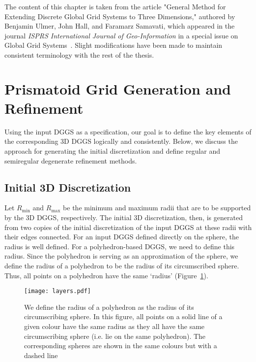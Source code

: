 The content of this chapter is taken from the article "General Method for Extending Discrete Global Grid Systems to Three Dimensions," authored by Benjamin Ulmer, John Hall, and Faramarz Samavati, which appeared in the journal \textit{ISPRS International Journal of Geo-Information} in a special issue on Global Grid Systems~\cite{ulmer2020general}.
Slight modifications have been made to maintain consistent terminology with the rest of the thesis.


\section{Prismatoid Grid Generation and Refinement} \label{chap:5:grid}
Using the input DGGS as a specification, our goal is to define the key elements of the corresponding 3D DGGS logically and consistently.
Below, we discuss the approach for generating the initial discretization and define regular and semiregular degenerate refinement methods. 


\subsection{Initial 3D Discretization} \label{chap:5:discretization}
Let $R_\mathrm{min}$ and $R_\mathrm{max}$ be the minimum and maximum radii that are to be supported by the 3D DGGS, respectively.
The initial 3D discretization, then, is generated from two copies of the initial discretization of the input DGGS at these radii with their edges connected.
For an input DGGS defined directly on the sphere, the radius is well defined.
For a polyhedron-based DGGS, we need to define this radius.
Since the polyhedron is serving as an approximation of the sphere, we define the radius of a polyhedron to be the radius of its circumscribed sphere.
Thus, all points on a polyhedron have the same `radius' (Figure~\ref{fig:layers}).


\begin{figure}[ht!]
	\centering
	\texttt{[image: layers.pdf]}
	\caption[How the radius of a polyhedron is defined]{
		We define the radius of a polyhedron as the radius of its circumscribing sphere.
		In this figure, all points on a solid line of a given colour have the same radius as they all have the same circumscribing sphere (i.e. lie on the same polyhedron).
		The corresponding spheres are shown in the same colours but with a dashed line
	}
	\label{fig:layers}
\end{figure}


